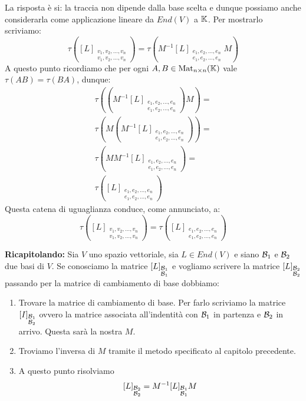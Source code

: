 La risposta è si: la traccia non dipende dalla base scelta e dunque possiamo
anche considerarla come applicazione lineare da $End(V)$ a $\mathbb{K}$.
Per mostrarlo scriviamo:
\[
	\tau \left(
	[L]_{\substack{
			v_1, v_2, \dots, v_n \\
			v_1, v_2, \dots, v_n
		}}
	\right) =
	\tau \left(
	M^{-1} [L]_{\substack{
			e_1, e_2, \dots, e_n \\
			e_1, e_2, \dots, e_n
		}} M
	\right)
\]
A questo punto ricordiamo che per ogni $A, B \in \operatorname{Mat}_{n \times n}(\mathbb{K})$
vale $\tau(AB) = \tau(BA)$, dunque:
\begin{gather*}
	\tau \left(
	\left(
		M^{-1}[L]_{\substack{
				e_1, e_2, \dots, e_n\\
				e_1, e_2, \dots, e_n
			}}
		\right) M
	\right) =\\
	\tau \left(
	M \left(
		M^{-1}[L]_{\substack{
				e_1, e_2, \dots, e_n\\
				e_1, e_2, \dots, e_n
			}}
		\right)
	\right) =\\
	\tau \left(
	M M^{-1} [L]_{\substack{
			e_1, e_2, \dots, e_n\\
			e_1, e_2, \dots, e_n
		}}
	\right) =\\
	\tau \left(
	[L]_{\substack{
			e_1, e_2, \dots, e_n \\
			e_1, e_2, \dots, e_n
		}}
	\right)
\end{gather*}
Questa catena di uguaglianza conduce, come annunciato, a:
\[
	\tau \left(
	[L]_{\substack{
			v_1, v_2, \dots, v_n \\
			v_1, v_2, \dots, v_n
		}}
	\right) =
	\tau \left(
	[L]_{\substack{
			e_1, e_2, \dots, e_n \\
			e_1, e_2, \dots, e_n
		}}
	\right)
\]

\textbf{Ricapitolando:} Sia $V$ uno spazio vettoriale, sia $L \in End(V)$ e siano
$\mathcal{B}_1$ e $\mathcal{B}_2$ due basi di $V$. Se conosciamo la matrice
$[L]_{\substack{\mathcal{B}_1 \\ \mathcal{B}_1}}$ e vogliamo scrivere la matrice
$[L]_{\substack{\mathcal{B}_2 \\ \mathcal{B}_2}}$ passando per la matrice di
cambiamento di base dobbiamo:
\begin{enumerate}
	\item Trovare la matrice di cambiamento di base. Per farlo scriviamo la
	      matrice $[I]_{\substack{\mathcal{B}_1 \\ \mathcal{B}_2}}$ ovvero la
	      matrice associata all'indentità con $\mathcal{B}_1$ in partenza e
	      $\mathcal{B}_2$ in arrivo. Questa sarà la nostra $M$.
	\item Troviamo l'inversa di $M$ tramite il metodo specificato al capitolo
	      precedente.
	\item A questo punto risolviamo
	      \[
		      [L]_{\substack{\mathcal{B}_2 \\ \mathcal{B}_2}} =
		      M^{-1} [L]_{\substack{\mathcal{B}_1 \\ \mathcal{B}_1}} M
	      \]
\end{enumerate}


